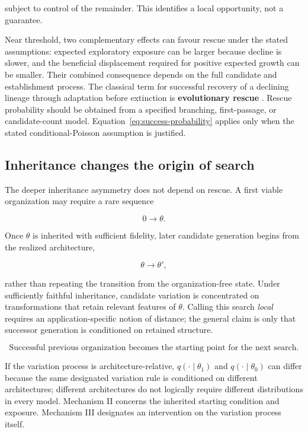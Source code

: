 \documentclass[11pt,a4paper]{article}
\begin{document}
subject to control of the remainder. This identifies a local opportunity, not a guarantee.

Near threshold, two complementary effects can favour rescue under the stated assumptions: expected exploratory exposure can be larger because decline is slower, and the beneficial displacement required for positive expected growth can be smaller. Their combined consequence depends on the full candidate and establishment process. The classical term for successful recovery of a declining lineage through adaptation before extinction is \textbf{evolutionary rescue} \citep{Bell2017}. Rescue probability should be obtained from a specified branching, first-passage, or candidate-count model. Equation~\eqref{eq:success-probability} applies only when the stated conditional-Poisson assumption is justified.

\subsection{Inheritance changes the origin of search}

The deeper inheritance asymmetry does not depend on rescue. A first viable organization may require a rare sequence

\[
0\longrightarrow\theta.
\]

Once $\theta$ is inherited with sufficient fidelity, later candidate generation begins from the realized architecture,

\[
\theta\longrightarrow\theta',
\]

rather than repeating the transition from the organization-free state. Under sufficiently faithful inheritance, candidate variation is concentrated on transformations that retain relevant features of $\theta$. Calling this search \emph{local} requires an application-specific notion of distance; the general claim is only that successor generation is conditioned on retained structure.

\[
\boxed{\text{Successful previous organization becomes the starting point for the next search.}}
\]

If the variation process is architecture-relative, $q(\cdot\mid\theta_1)$ and $q(\cdot\mid\theta_0)$ can differ because the same designated variation rule is conditioned on different architectures; different architectures do not logically require different distributions in every model. Mechanism II concerns the inherited starting condition and exposure. Mechanism III designates an intervention on the variation process itself.
\end{document}
